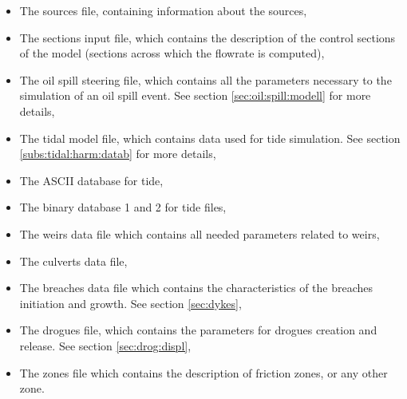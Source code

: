 \begin{itemize}
\item The sources file, containing information about the sources,

\item The sections input file, which contains the description of the control
sections of the model (sections across which the flowrate is computed),

\item The oil spill steering file, which contains all the parameters necessary
to the simulation of an oil spill event.
See section \ref{sec:oil:spill:modell} for more details,

\item The tidal model file, which contains data used for tide simulation.
See section \ref{subs:tidal:harm:datab} for more details,

\item The ASCII database for tide,

\item The binary database 1 and 2 for tide files,

\item The weirs data file which contains all needed parameters related to weirs,

\item The culverts data file,


\item The breaches data file which contains the characteristics of the breaches
initiation and growth.
See section \ref{sec:dykes},

\item The drogues file, which contains the parameters for drogues creation and
release.
See section \ref{sec:drog:displ},

\item The zones file which contains the description of friction zones, or any
other zone.


\end{itemize}



